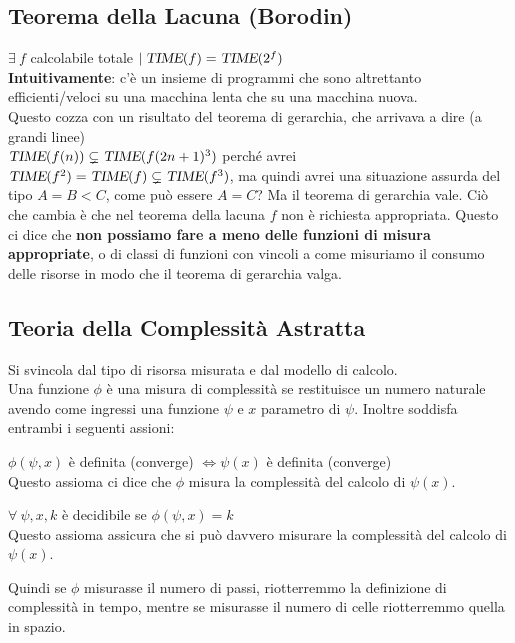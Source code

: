 \documentclass[10pt]{book}
\begin{document}
\subsection{Teorema della Lacuna (Borodin)}
$\exists\:f$ calcolabile totale $|\:\textsl{TIME}(f) = \textsl{TIME}(2^f)$\\
\textbf{Intuitivamente}: c'è un insieme di programmi che sono altrettanto efficienti/veloci su una macchina lenta che su una macchina nuova.\\
Questo cozza con un risultato del teorema di gerarchia, che arrivava a dire (a grandi linee)\\$\textsl{TIME}(f(n)) \subsetneq \textsl{TIME}(f(2n + 1)^3)$ perché avrei $\textsl{TIME}(f^2) = \textsl{TIME}(f) \subsetneq \textsl{TIME}(f^3)$, ma quindi avrei una situazione assurda del tipo $A = B < C$, come può essere $A = C$? Ma il teorema di gerarchia vale. Ciò che cambia è che nel teorema della lacuna $f$ non è richiesta appropriata. Questo ci dice che \textbf{non possiamo fare a meno delle funzioni di misura appropriate}, o di classi di funzioni con vincoli a come misuriamo il consumo delle risorse in modo che il teorema di gerarchia valga.
\subsection{Teoria della Complessità Astratta}
Si svincola dal tipo di risorsa misurata e dal modello di calcolo.\\
Una funzione $\phi$ è una misura di complessità se restituisce un numero naturale avendo come ingressi una funzione $\psi$ e $x$ parametro di $\psi$. Inoltre soddisfa entrambi i seguenti assioni: \begin{list}{}{}
	\item $\phi(\psi, x)$ è definita (converge) $\Leftrightarrow \psi(x)$ è definita (converge)\\
	Questo assioma ci dice che $\phi$ misura la complessità del calcolo di $\psi(x)$.
	\item $\forall\:\psi, x, k$ è decidibile se $\phi(\psi, x) = k$\\
	Questo assioma assicura che si può davvero misurare la complessità del calcolo di $\psi(x)$.
\end{list}
Quindi se $\phi$ misurasse il numero di passi, riotterremmo la definizione di complessità in tempo, mentre se misurasse il numero di celle riotterremmo quella in spazio.
\end{document}
